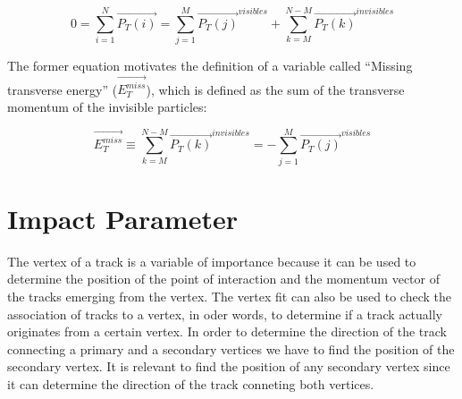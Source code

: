 \begin{equation}
  0 = \sum_{i=1}^N \vec{P_T(i)} = \sum_{j=1}^M \vec{P_T(j)}^{visibles} + \sum_{k=M}^{N-M} \vec{P_T(k)}^{invisibles}
 \end{equation}

 The former equation motivates the definition of a variable called ``Missing transverse energy'' ($\vec{E_T^{miss}}$), which is defined as the sum of the transverse momentum of the invisible
 particles:
 
 \begin{equation}
  \vec{E_T^{miss}} \equiv \sum_{k=M}^{N-M}\vec{P_T(k)}^{invisibles} = - \sum_{j=1}^M  \vec{P_T(j)}^{visibles}
 \end{equation}

 
 \section{Impact Parameter}
The vertex of a track is a variable of importance because it can be used to determine the position of the point of interaction and the momentum vector of the tracks emerging from the vertex. The 
vertex fit can also be used to check the association of tracks to a vertex, in oder words, to determine if a track actually originates from a certain vertex. In order to determine the direction of the
track connecting a primary and a secondary vertices we have to find the position of the secondary vertex.
It is relevant to find the position
of any secondary vertex since it can determine the direction of the track conneting both vertices.
 
 
 
 
 
 
 
 
 
 
 
 
 
 
 
 
 
 
 
 
 
 
 
